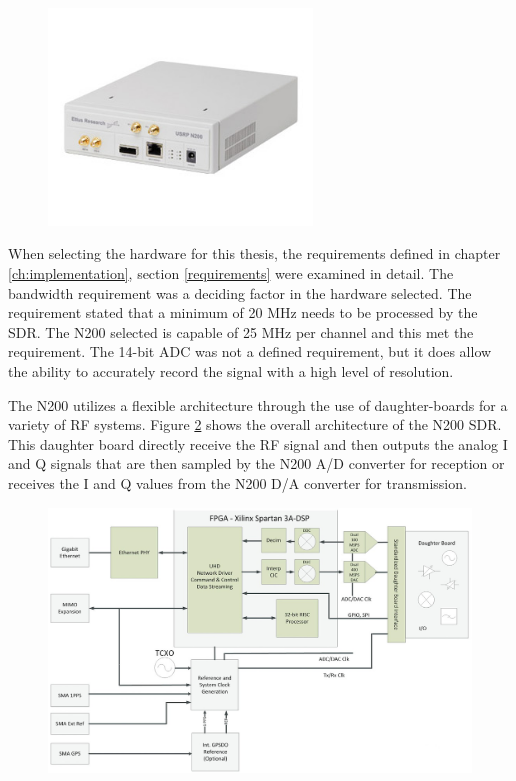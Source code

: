 {\begin{figure}[h!tb] 
\centering
\includegraphics[width=7cm]{Images/n200}
\label{N200}
\end{figure}
}

When selecting the hardware for this thesis, the requirements defined in chapter \ref{ch:implementation}, section \ref{requirements} were examined in detail.  The bandwidth requirement was a deciding factor in the hardware selected.  The requirement stated that a minimum of 20 MHz needs to be processed by the SDR.  The N200 selected is capable of 25 MHz per channel and this met the requirement.  The 14-bit ADC was not a defined requirement, but it does allow the ability to accurately record the signal with a high level of resolution.  

The N200 utilizes a flexible architecture through the use of daughter-boards for a variety of RF systems.  Figure \ref{N200_block} shows the overall architecture of the N200 SDR.  This daughter board directly receive the RF signal and then outputs the analog I and Q signals that are then sampled by the N200 A/D converter for reception or receives the I and Q values from the N200 D/A converter for transmission. 

{\begin{figure}[h!tb] 
\centering
\includegraphics[width=14cm]{Images/n200_block_edited}
\label{N200_block}
\end{figure}
}

